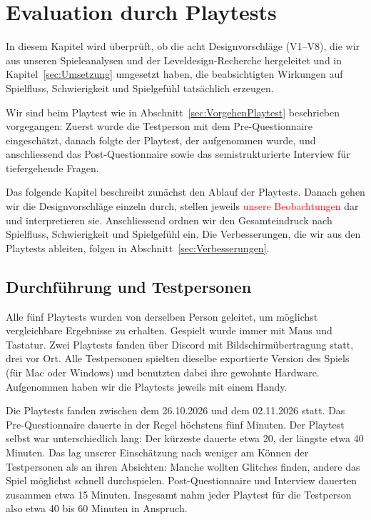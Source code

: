 \documentclass[../Main.tex]{subfiles}
\begin{document}
\section{Evaluation durch Playtests} \label{sec:Evaluation}

In diesem Kapitel wird überprüft, ob die acht Designvorschläge (V1--V8), die wir aus unseren Spieleanalysen und der Leveldesign-Recherche hergeleitet und in Kapitel~\ref{sec:Umsetzung} umgesetzt haben, die beabsichtigten Wirkungen auf Spielfluss, Schwierigkeit und Spielgefühl tatsächlich erzeugen.

Wir sind beim Playtest wie in Abschnitt~\ref{sec:VorgehenPlaytest} beschrieben vorgegangen: Zuerst wurde die Testperson mit dem Pre-Questionnaire eingeschätzt, danach folgte der Playtest, der aufgenommen wurde, und anschliessend das Post-Questionnaire sowie das semistrukturierte Interview für tiefergehende Fragen.

Das folgende Kapitel beschreibt zunächst den Ablauf der Playtests. Danach gehen wir die Designvorschläge einzeln durch, stellen jeweils \textcolor{red}{unsere Beobachtungen} dar und interpretieren sie. Anschliessend ordnen wir den Gesamteindruck nach Spielfluss, Schwierigkeit und Spielgefühl ein. Die Verbesserungen, die wir aus den Playtests ableiten, folgen in Abschnitt~\ref{sec:Verbesserungen}.

\subsection{Durchführung und Testpersonen} \label{sec:Durchfuehrung}

Alle fünf Playtests wurden von derselben Person geleitet, um möglichst vergleichbare Ergebnisse zu erhalten. Gespielt wurde immer mit Maus und Tastatur. Zwei Playtests fanden über Discord mit Bildschirmübertragung statt, drei vor Ort. Alle Testpersonen spielten dieselbe exportierte Version des Spiels (für Mac oder Windows) und benutzten dabei ihre gewohnte Hardware. Aufgenommen haben wir die Playtests jeweils mit einem Handy.

Die Playtests fanden zwischen dem 26.10.2026 und dem 02.11.2026 statt. Das Pre-Questionnaire dauerte in der Regel höchstens fünf Minuten. Der Playtest selbst war unterschiedlich lang: Der kürzeste dauerte etwa 20, der längste etwa 40 Minuten. Das lag unserer Einschätzung nach weniger am Können der Testpersonen als an ihren Absichten: Manche wollten Glitches finden, andere das Spiel möglichst schnell durchspielen. Post-Questionnaire und Interview dauerten zusammen etwa 15 Minuten. Insgesamt nahm jeder Playtest für die Testperson also etwa 40 bis 60 Minuten in Anspruch.
\end{document}
